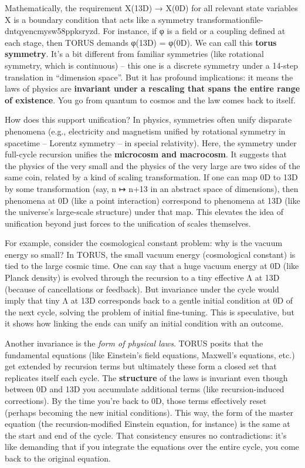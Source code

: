 \documentclass[
]{article}
\begin{document}
Mathematically, the requirement X(13D) → X(0D) for all relevant state
variables X is a boundary condition that acts like a symmetry
transformation\hspace{0pt}file-dntqyencmysw58ppksryzd. For instance, if
φ is a field or a coupling defined at each stage, then TORUS demands
φ(13D) = φ(0D). We can call this \textbf{torus symmetry}. It's a bit
different from familiar symmetries (like rotational symmetry, which is
continuous) -- this one is a discrete symmetry under a 14-step
translation in ``dimension space''. But it has profound implications: it
means the laws of physics are \textbf{invariant under a rescaling that
spans the entire range of existence}. You go from quantum to cosmos and
the law comes back to itself.

How does this support unification? In physics, symmetries often unify
disparate phenomena (e.g., electricity and magnetism unified by
rotational symmetry in spacetime -- Lorentz symmetry -- in special
relativity). Here, the symmetry under full-cycle recursion unifies the
\textbf{microcosm and macrocosm}. It suggests that the physics of the
very small and the physics of the very large are two sides of the same
coin, related by a kind of scaling transformation. If one can map 0D to
13D by some transformation (say, n ↦ n+13 in an abstract space of
dimensions), then phenomena at 0D (like a point interaction) correspond
to phenomena at 13D (like the universe's large-scale structure) under
that map. This elevates the idea of unification beyond just forces to
the unification of scales themselves.

For example, consider the cosmological constant problem: why is the
vacuum energy so small? In TORUS, the small vacuum energy (cosmological
constant) is tied to the large cosmic time. One can say that a huge
vacuum energy at 0D (like Planck density) is evolved through the
recursion to a tiny effective Λ at 13D (because of cancellations or
feedback). But invariance under the cycle would imply that tiny Λ at 13D
corresponds back to a gentle initial condition at 0D of the next cycle,
solving the problem of initial fine-tuning. This is speculative, but it
shows how linking the ends can unify an initial condition with an
outcome.

Another invariance is the \emph{form of physical laws}. TORUS posits
that the fundamental equations (like Einstein's field equations,
Maxwell's equations, etc.) get extended by recursion terms but
ultimately these form a closed set that replicates itself each cycle.
The \textbf{structure} of the laws is invariant even though between 0D
and 13D you accumulate additional terms (like recursion-induced
corrections). By the time you're back to 0D, those terms effectively
reset (perhaps becoming the new initial conditions). This way, the form
of the master equation (the recursion-modified Einstein equation, for
instance) is the same at the start and end of the cycle\hspace{0pt}.
That consistency ensures no contradictions: it's like demanding that if
you integrate the equations over the entire cycle, you come back to the
original equation.
\end{document}
